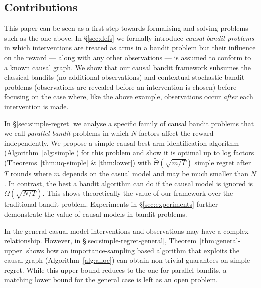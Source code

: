 \subsection{Contributions}

This paper can be seen as a first step towards formalising and solving problems such as the one above. 
In \S\ref{sec:defs} we formally introduce \emph{causal bandit problems} in which interventions are treated as arms in a bandit problem but their influence on the reward --- along with any other observations --- is assumed to conform to a known causal graph. 
We show that our causal bandit framework subsumes the classical bandits (no additional observations) and contextual stochastic bandit problems (observations are revealed before an intervention is chosen) before focusing on the case where, like the above example, observations occur \emph{after} each intervention is made.

In \S\ref{sec:simple-regret} we analyse a specific family of causal bandit problems that we call \emph{parallel bandit} problems in which $N$ factors affect the reward independently.
We propose a simple causal best arm identification algorithm (Algorithm~\ref{alg:simple}) for this problem and show it is optimal up to log factors (Theorems~\ref{thm:uq-simple} \& \ref{thm:lower}) with $\tilde{\Theta}(\sqrt{m/T})$ simple regret after $T$ rounds where $m$ depends on the casual model and may be much smaller than $N$.
In contrast, the best a bandit algorithm can do if the causal model is ignored is $\Omega(\sqrt{N/T})$.
This shows theoretically the value of our framework over the traditional bandit problem. 
Experiments in \S\ref{sec:experiments} further demonstrate the value of causal models in bandit problems.

In the general casual model interventions and observations may have a complex relationship. 
However, in \S\ref{sec:simple-regret-general}, Theorem~\ref{thm:general-upper} shows how an importance-sampling based algorithm that exploits the causal graph (Algorithm~\ref{alg:alloc}) can obtain non-trivial guarantees on simple regret.
While this upper bound reduces to the one for parallel bandits, a matching lower bound for the general case is left as an open problem.



